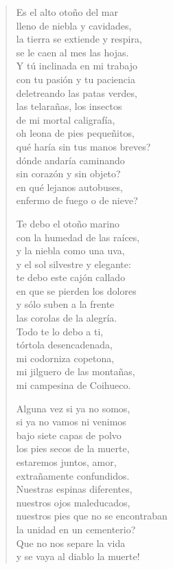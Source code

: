 \documentclass[12pt]{article}
\begin{document}
\begin{verse}
Es el alto otoño del mar\\
lleno de niebla y cavidades,\\
la tierra se extiende y respira,\\
se le caen al mes las hojas.\\
Y tú inclinada en mi trabajo\\
con tu pasión y tu paciencia\\
deletreando las patas verdes,\\
las telarañas, los insectos\\
de mi mortal caligrafía,\\
oh leona de pies pequeñitos,\\
qué haría sin tus manos breves?\\
dónde andaría caminando\\
sin corazón y sin objeto?\\
en qué lejanos autobuses,\\
enfermo de fuego o de nieve?  

Te debo el otoño marino\\
con la humedad de las raíces,\\
y la niebla como una uva,\\
y el sol silvestre y elegante:\\
te debo este cajón callado\\
en que se pierden los dolores\\
y sólo suben a la frente\\
las corolas de la alegría.\\
Todo te lo debo a ti,\\
tórtola desencadenada,\\
mi codorniza copetona,\\
mi jilguero de las montañas,\\
mi campesina de Coihueco.  

Alguna vez si ya no somos,\\
si ya no vamos ni venimos\\
bajo siete capas de polvo\\
los pies secos de la muerte,\\
estaremos juntos, amor,\\
extrañamente confundidos.\\
Nuestras espinas diferentes,\\
nuestros ojos maleducados,\\
nuestros pies que no se encontraban\\
la unidad en un cementerio?\\
Que no nos separe la vida\\
y se vaya al diablo la muerte!  


\end{verse}
\end{document}
